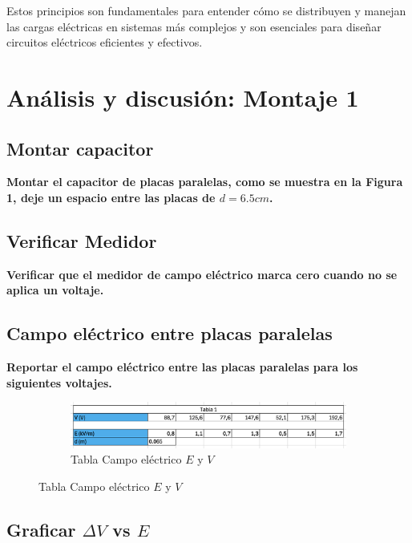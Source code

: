Estos principios son fundamentales para entender cómo se distribuyen y manejan las cargas eléctricas en sistemas más complejos y son esenciales para diseñar circuitos eléctricos eficientes y efectivos.

\section{Análisis y discusión: Montaje 1}

\subsection{Montar capacitor}
\textbf{Montar el capacitor de placas paralelas, como se muestra en la Figura 1, deje un
espacio entre las placas de $d = 6.5cm$.}

\subsection{Verificar Medidor}
\textbf{Verificar que el medidor de campo eléctrico marca cero cuando no se aplica un
voltaje.}

\subsection{Campo eléctrico entre placas paralelas}
\textbf{Reportar el campo eléctrico entre las placas paralelas para los siguientes voltajes.}

\begin{figure}[H]
    \centering
    \begin{subfigure}[b]{\textwidth}
        \centering
        \includegraphics[width=\textwidth]{Figures/1. Content/tablaCampoVSV.png}
        \caption{Tabla Campo eléctrico $E$ y $V$}
        \label{fig: tabla Campo vs V}
    \end{subfigure}
    \hfill
\end{figure}


\subsection{Graficar $\Delta V$ vs $E$}

